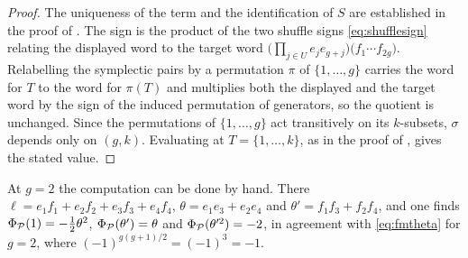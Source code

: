 \begin{proof}
The uniqueness of the term and the identification of $S$ are established in
the proof of . The sign is the product of the two shuffle
signs \eqref{eq:shufflesign} relating the displayed word to the target word
$\bigl(\prod_{j\in U}e_{j}e_{g+j}\bigr)\bigl(f_{1}\cdots f_{2g}\bigr)$.
Relabelling the symplectic pairs by a permutation $\pi$ of $\{1,\dots,g\}$
carries the word for $T$ to the word for $\pi(T)$ and multiplies both the
displayed and the target word by the sign of the induced permutation of
generators, so the quotient is unchanged. Since the permutations of
$\{1,\dots,g\}$ act transitively on its $k$-subsets, $\sigma$ depends only on
$(g,k)$. Evaluating at $T=\{1,\dots,k\}$, as in the proof of
, gives the stated value.
\end{proof}

\begin{remark}
At $g=2$ the computation can be done by hand. There
$\ell=e_{1}f_{1}+e_{2}f_{2}+e_{3}f_{3}+e_{4}f_{4}$,
$\theta=e_{1}e_{3}+e_{2}e_{4}$ and $\theta'=f_{1}f_{3}+f_{2}f_{4}$, and one
finds $\Phi_{\mathcal{P}}(1)=-\tfrac12\theta^{2}$, $\Phi_{\mathcal{P}}(\theta')=\theta$ and
$\Phi_{\mathcal{P}}(\theta'^{2})=-2$, in agreement with \eqref{eq:fmtheta} for $g=2$,
where $(-1)^{g(g+1)/2}=(-1)^{3}=-1$.
\end{remark}
